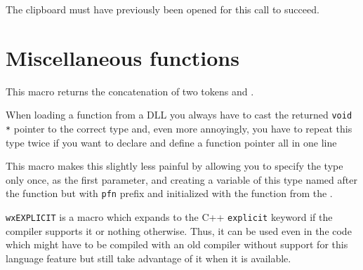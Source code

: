 The clipboard must have previously been opened for this call to succeed.




\section{Miscellaneous functions}\label{miscellany}


\label{wxconcat}


This macro returns the concatenation of two tokens  and .


\label{wxdynlibfunction}


When loading a function from a DLL you always have to cast the returned 
{\tt void *} pointer to the correct type and, even more annoyingly, you have to
repeat this type twice if you want to declare and define a function pointer all
in one line

This macro makes this slightly less painful by allowing you to specify the
type only once, as the first parameter, and creating a variable of this type
named after the function but with {\tt pfn} prefix and initialized with the
function  from the  
.







\label{wxexplicit}

{\tt wxEXPLICIT} is a macro which expands to the C++ {\tt explicit} keyword if
the compiler supports it or nothing otherwise. Thus, it can be used even in the
code which might have to be compiled with an old compiler without support for
this language feature but still take advantage of it when it is available.


\label{wxgetkeystate}


